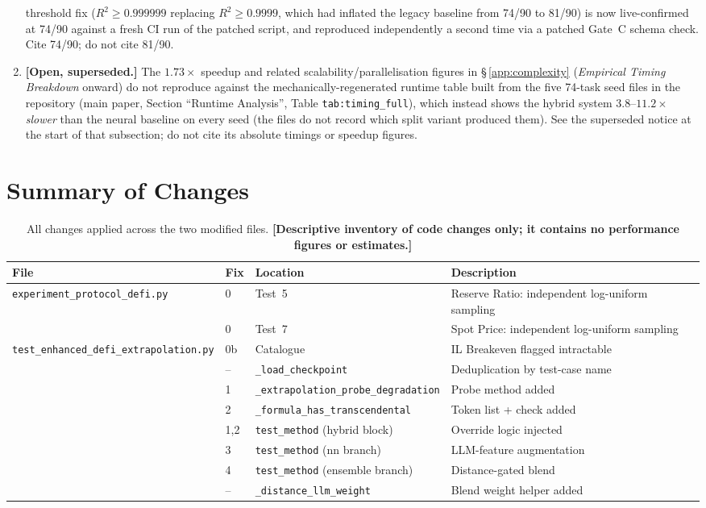 \documentclass[twoside,11pt]{article}
\begin{document}
\begin{enumerate}[leftmargin=*]
    threshold fix ($R^2 \geq 0.999999$ replacing $R^2 \geq 0.9999$, which
    had inflated the legacy baseline from 74/90 to 81/90) is now
    live-confirmed at 74/90 against a fresh CI run of the patched script,
    and reproduced independently a second time via a patched Gate~C
    schema check. Cite 74/90; do not cite 81/90.
  \item \textbf{[Open, superseded.]} The $1.73\times$ speedup and related
    scalability/parallelisation figures in \S\,\ref{app:complexity}
    (\emph{Empirical Timing Breakdown} onward) do not reproduce against
    the mechanically-regenerated runtime table built from the five 74-task seed
    files in the repository (main paper, Section ``Runtime Analysis'', Table \texttt{tab:timing\_full}),
    which instead shows the hybrid system $3.8$--$11.2\times$ \emph{slower} than
    the neural baseline on every seed (the files do not record which split variant
    produced them). See the superseded notice at the
    start of that subsection; do not cite its absolute timings or
    speedup figures.
\end{enumerate}

\section{Summary of Changes}
\label{sec:changes}

\begin{table}[h]
\centering
\caption{All changes applied across the two modified files.
  \textbf{[Descriptive inventory of code changes only; it contains no performance
  figures or estimates.]}}
\label{tab:changes}
\begin{tabular}{llll}
\toprule
\textbf{File} & \textbf{Fix} & \textbf{Location} & \textbf{Description} \\
\midrule
\texttt{experiment\_protocol\_defi.py}
  & 0  & Test~5  & Reserve Ratio: independent log-uniform sampling \\
  & 0  & Test~7  & Spot Price: independent log-uniform sampling \\
\midrule
\texttt{test\_enhanced\_defi\_extrapolation.py}
  & 0b & Catalogue     & IL Breakeven flagged intractable \\
  & -- & \texttt{\_load\_checkpoint} & Deduplication by test-case name \\
  & 1  & \texttt{\_extrapolation\_probe\_degradation} & Probe method added \\
  & 2  & \texttt{\_formula\_has\_transcendental} & Token list + check added \\
  & 1,2& \texttt{test\_method} (hybrid block) & Override logic injected \\
  & 3  & \texttt{test\_method} (nn branch)     & LLM-feature augmentation \\
  & 4  & \texttt{test\_method} (ensemble branch) & Distance-gated blend \\
  & -- & \texttt{\_distance\_llm\_weight} & Blend weight helper added \\
\bottomrule
\end{tabular}
\end{table}
\end{document}

